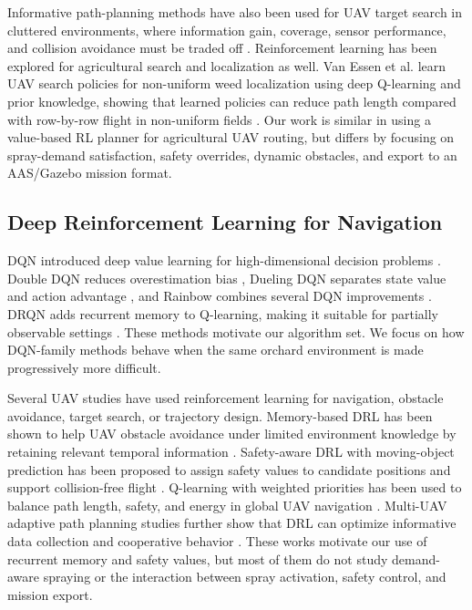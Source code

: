 \documentclass[conference,10pt]{IEEEtran}
\begin{document}
Informative path-planning methods have also been used for UAV target search in cluttered environments, where information gain, coverage, sensor performance, and collision avoidance must be traded off \cite{meera2019oaipp}. Reinforcement learning has been explored for agricultural search and localization as well. Van Essen et al. learn UAV search policies for non-uniform weed localization using deep Q-learning and prior knowledge, showing that learned policies can reduce path length compared with row-by-row flight in non-uniform fields \cite{vanessen2025weeds}. Our work is similar in using a value-based RL planner for agricultural UAV routing, but differs by focusing on spray-demand satisfaction, safety overrides, dynamic obstacles, and export to an AAS/Gazebo mission format.

\subsection{Deep Reinforcement Learning for Navigation}
DQN introduced deep value learning for high-dimensional decision problems \cite{mnih2015dqn}. Double DQN reduces overestimation bias \cite{vanhasselt2016double}, Dueling DQN separates state value and action advantage \cite{wang2016dueling}, and Rainbow combines several DQN improvements \cite{hessel2018rainbow}. DRQN adds recurrent memory to Q-learning, making it suitable for partially observable settings \cite{hausknecht2015drqn}. These methods motivate our algorithm set. We focus on how DQN-family methods behave when the same orchard environment is made progressively more difficult.

Several UAV studies have used reinforcement learning for navigation, obstacle avoidance, target search, or trajectory design. Memory-based DRL has been shown to help UAV obstacle avoidance under limited environment knowledge by retaining relevant temporal information \cite{singla2021memory}. Safety-aware DRL with moving-object prediction has been proposed to assign safety values to candidate positions and support collision-free flight \cite{liao2025moving}. Q-learning with weighted priorities has been used to balance path length, safety, and energy in global UAV navigation \cite{carvalho2025qlearning}. Multi-UAV adaptive path planning studies further show that DRL can optimize informative data collection and cooperative behavior \cite{westheider2023multi}. These works motivate our use of recurrent memory and safety values, but most of them do not study demand-aware spraying or the interaction between spray activation, safety control, and mission export.
\end{document}

